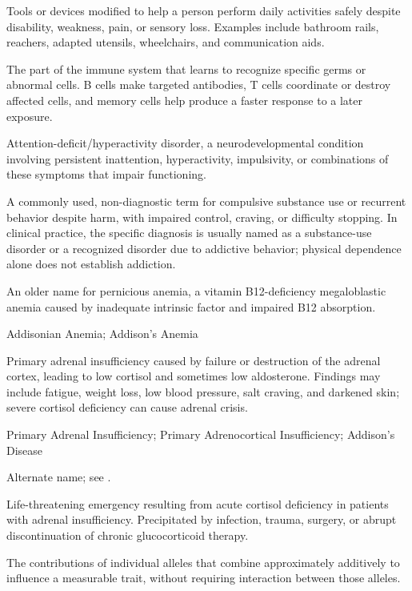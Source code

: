  Tools or devices modified to help a person perform daily activities safely despite disability, weakness, pain, or sensory loss. Examples include bathroom rails, reachers, adapted utensils, wheelchairs, and communication aids.

 The part of the immune system that learns to recognize specific germs or abnormal cells. B cells make targeted antibodies, T cells coordinate or destroy affected cells, and memory cells help produce a faster response to a later exposure.

 Attention-deficit/hyperactivity disorder, a neurodevelopmental condition involving persistent inattention, hyperactivity, impulsivity, or combinations of these symptoms that impair functioning.

 A commonly used, non-diagnostic term for compulsive substance use or
recurrent behavior despite harm, with impaired control, craving, or difficulty stopping.
In clinical practice, the specific diagnosis is usually named as a substance-use disorder
or a recognized disorder due to addictive behavior; physical dependence alone does not
establish addiction.

 An older name for pernicious anemia, a vitamin B12-deficiency megaloblastic anemia caused by inadequate intrinsic factor and impaired B12 absorption.

\synonyms
Addisonian Anemia; Addison's Anemia

 Primary adrenal insufficiency caused by failure or destruction of
the adrenal cortex, leading to low cortisol and sometimes low aldosterone. Findings may
include fatigue, weight loss, low blood pressure, salt craving, and darkened skin; severe
cortisol deficiency can cause adrenal crisis.

\synonyms
Primary Adrenal Insufficiency; Primary Adrenocortical Insufficiency; Addison's Disease

 Alternate name; see .

 Life-threatening emergency resulting from acute cortisol deficiency in patients with
adrenal insufficiency. Precipitated by infection, trauma, surgery, or abrupt
discontinuation of chronic glucocorticoid therapy.

 The contributions of individual alleles that combine approximately additively to influence a measurable trait, without requiring interaction between those alleles.

